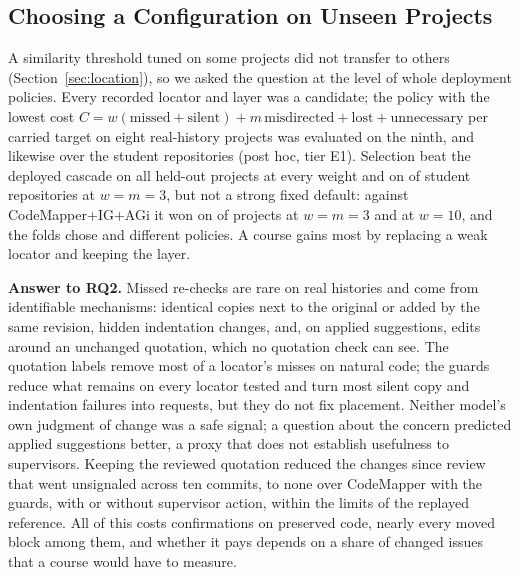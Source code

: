 \subsection{Choosing a Configuration on Unseen Projects}\label{sec:policy}
A similarity threshold tuned on some projects did not transfer to others (Section~\ref{sec:location}), so we asked the question at the level of whole deployment policies. Every recorded locator and layer was a candidate; the policy with the lowest cost $C=w(\text{missed}+\text{silent})+m\,\text{misdirected}+\text{lost}+\text{unnecessary}$ per carried target on eight real-history projects was evaluated on the ninth, and likewise over the student repositories (post hoc, tier E1). Selection beat the deployed cascade on all \wzRealThreeFolds{} held-out projects at every weight and on \wzStuThreeBeatDep{} of \wzStuThreeFolds{} student repositories at $w=m=3$, but not a strong fixed default: against CodeMapper+IG+AGi it won on \wzRealThreeBeatCm{} of \wzRealThreeFolds{} projects at $w=m=3$ and \wzRealTenBeatCm{} at $w=10$, and the folds chose \wzRealThreeDistinct{} and \wzRealTenDistinct{} different policies. A course gains most by replacing a weak locator and keeping the layer.

\textbf{Answer to RQ2.} Missed re-checks are rare on real histories and come from identifiable mechanisms: identical copies next to the original or added by the same revision, hidden indentation changes, and, on applied suggestions, edits around an unchanged quotation, which no quotation check can see. The quotation labels remove most of a locator's misses on natural code; the guards reduce what remains on every locator tested and turn most silent copy and indentation failures into requests, but they do not fix placement. Neither model's own judgment of change was a safe signal; a question about the concern predicted applied suggestions better, a proxy that does not establish usefulness to supervisors. Keeping the reviewed quotation reduced the changes since review that went unsignaled across ten commits, to none over CodeMapper with the guards, with or without supervisor action, within the limits of the replayed reference. All of this costs confirmations on preserved code, nearly every moved block among them, and whether it pays depends on a share of changed issues that a course would have to measure.
